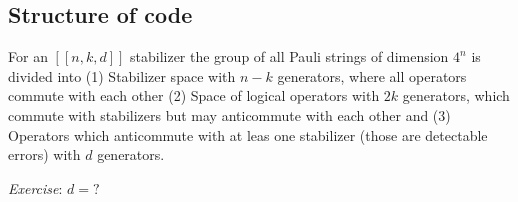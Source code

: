 \documentclass[12 pt]{article}
\begin{document}
\subsection{Structure of code}
For an $[[n, k, d]]$ stabilizer the group of all Pauli strings of dimension $4^n$ is divided into (1) Stabilizer space with $n-k$ generators, where all operators commute with each other (2) Space of logical operators with $2k$ generators, which commute with stabilizers but may anticommute with each other and (3) Operators which anticommute with at leas one stabilizer (those are detectable errors) with $d$ generators.

\textit{Exercise}: $d=?$
\end{document}
